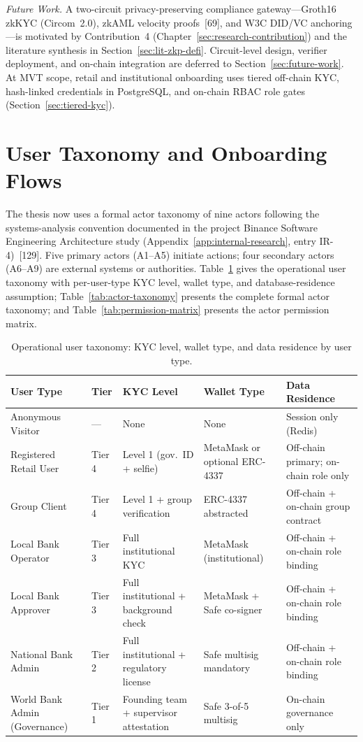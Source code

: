 \documentclass[12pt,a4paper]{report}
\newcommand{\tableheadcolor}{\rowcolor{TableHeadBg}}
\begin{document}
\noindent\textit{Future Work.} A two-circuit privacy-preserving compliance gateway---Groth16 zkKYC (Circom~2.0), zkAML velocity proofs~[69], and W3C DID/VC anchoring---is motivated by Contribution~4 (Chapter~\ref{sec:research-contribution}) and the literature synthesis in Section~\ref{sec:lit-zkp-defi}. Circuit-level design, verifier deployment, and on-chain integration are deferred to Section~\ref{sec:future-work}. At MVT scope, retail and institutional onboarding uses tiered off-chain KYC, hash-linked credentials in PostgreSQL, and on-chain RBAC role gates (Section~\ref{sec:tiered-kyc}).

\section{User Taxonomy and Onboarding Flows}
\label{sec:onboarding}

The thesis now uses a formal actor taxonomy of nine actors following the systems-analysis convention documented in the project Binance Software Engineering Architecture study (Appendix~\ref{app:internal-research}, entry IR-4)~[129]. Five primary actors (A1--A5) initiate actions; four secondary actors (A6--A9) are external systems or authorities. Table~\ref{tab:user-taxonomy} gives the operational user taxonomy with per-user-type KYC level, wallet type, and database-residence assumption; Table~\ref{tab:actor-taxonomy} presents the complete formal actor taxonomy; and Table~\ref{tab:permission-matrix} presents the actor permission matrix.

\begin{table}[H]
\centering
\caption[Operational user taxonomy]{Operational user taxonomy: KYC level, wallet type, and data residence by user type.}
\label{tab:user-taxonomy}
\begin{tabular}{p{3.1cm}p{1.4cm}p{2.6cm}p{2.4cm}p{3.4cm}}
\toprule
\tableheadcolor
\textbf{User Type} & \textbf{Tier} & \textbf{KYC Level} & \textbf{Wallet Type} & \textbf{Data Residence} \\
\midrule
Anonymous Visitor & --- & None & None & Session only (Redis) \\
Registered Retail User & Tier 4 & Level 1 (gov.\ ID + selfie) & MetaMask or optional ERC-4337 & Off-chain primary; on-chain role only \\
Group Client & Tier 4 & Level 1 + group verification & ERC-4337 abstracted & Off-chain + on-chain group contract \\
Local Bank Operator & Tier 3 & Full institutional KYC & MetaMask (institutional) & Off-chain + on-chain role binding \\
Local Bank Approver & Tier 3 & Full institutional + background check & MetaMask + Safe co-signer & Off-chain + on-chain role binding \\
National Bank Admin & Tier 2 & Full institutional + regulatory license & Safe multisig mandatory & Off-chain + on-chain role binding \\
World Bank Admin (Governance) & Tier 1 & Founding team + supervisor attestation & Safe 3-of-5 multisig & On-chain governance only \\
\bottomrule
\end{tabular}
\end{table}
\end{document}
